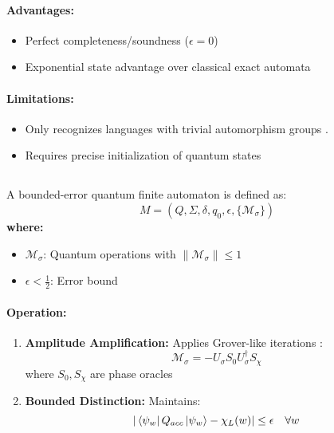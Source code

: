\paragraph{Advantages:}
\begin{itemize}
    \item Perfect completeness/soundness ($\epsilon = 0$)
    \item Exponential state advantage over classical exact automata
\end{itemize}

\paragraph{Limitations:}
\begin{itemize}
    \item Only recognizes languages with trivial automorphism groups \cite{brodsky2001}.
    \item Requires precise initialization of quantum states
\end{itemize}

\subsection{}
\label{subsec:beqfa}

\begin{definition}
A bounded-error quantum finite automaton is defined as:
\[
M = (Q, \Sigma, \delta, q_0, \epsilon, \{\mathcal{M}_\sigma\})
\]
\textbf{where:}
\begin{itemize}
    \item $\mathcal{M}_\sigma$: Quantum operations with $\|\mathcal{M}_\sigma\| \leq 1$
    \item $\epsilon < \frac{1}{2}$: Error bound
\end{itemize}
\end{definition}

\paragraph{Operation:}
\begin{enumerate}
    \item \textbf{Amplitude Amplification:} Applies Grover-like iterations \cite{grover1996fast, ambainis2002quantum}:
    \[
    \mathcal{M}_\sigma = -U_\sigma S_0 U_\sigma^\dagger S_\chi
    \]
    where $S_0, S_\chi$ are phase oracles
    \item \textbf{Bounded Distinction:} Maintains:
    \[
    |\bra{\psi_w}Q_{acc}\ket{\psi_w} - \chi_L(w)| \leq \epsilon \quad \forall w
    \]
\end{enumerate}

